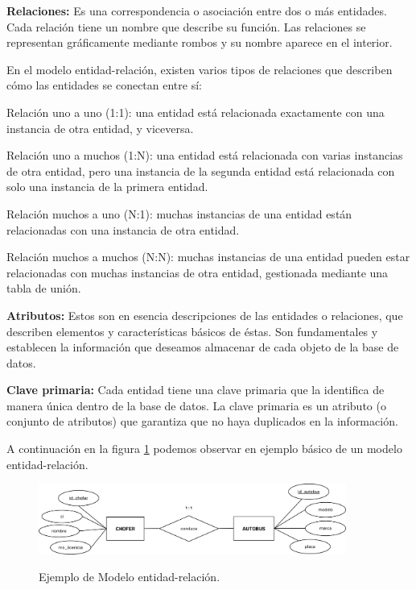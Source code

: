		\textbf{Relaciones:} Es una correspondencia o asociación entre dos o más entidades. Cada relación tiene un nombre que describe su función. Las relaciones se representan gráficamente mediante rombos y su nombre aparece en el interior.
		
		En el modelo entidad-relación, existen varios tipos de relaciones que describen cómo las entidades se conectan entre sí:
		
		Relación uno a uno (1:1): una entidad está relacionada exactamente con una instancia de otra entidad, y viceversa.
		
		Relación uno a muchos (1:N): una entidad está relacionada con varias instancias de otra entidad, pero una instancia de la segunda entidad está relacionada con solo una instancia de la primera entidad.
		
		Relación muchos a uno (N:1): muchas instancias de una entidad están relacionadas con una instancia de otra entidad.
		
		Relación muchos a muchos (N:N): muchas instancias de una entidad pueden estar relacionadas con muchas instancias de otra entidad, gestionada mediante una tabla de unión.
		
		\textbf{Atributos:} Estos son en esencia descripciones de las entidades o relaciones, que describen elementos y características básicos de éstas. Son fundamentales y establecen la información que deseamos almacenar de cada objeto de la base de datos.
		
		\textbf{Clave primaria:} Cada entidad tiene una clave primaria que la identifica de manera única dentro de la base de datos. La clave primaria es un atributo (o conjunto de atributos) que garantiza que no haya duplicados en la información.
		
		A continuación en la figura \ref{fig:figura2_3} podemos observar en ejemplo básico de un modelo entidad-relación.
		
		\vspace{0.3cm} %
		
		\begin{figure}[h] %
			\caption[Ejemplo MER]
			{\newline Ejemplo de Modelo entidad-relación.} %
			\vspace{0.3cm}
			\centering
			\includegraphics[width=0.9\textwidth]{imagenes/figura2_3.png} %
			\vspace{0.3cm}
			\vspace{-0.6cm}
			\label{fig:figura2_3} %
		\end{figure}
	
